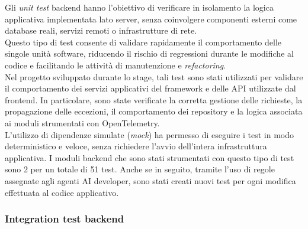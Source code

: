 Gli \emph{unit test} backend hanno l’obiettivo di verificare in isolamento la
logica applicativa implementata lato server, senza coinvolgere componenti esterni
come database reali, servizi remoti o infrastrutture di rete.\\
Questo tipo di test consente di validare rapidamente il comportamento delle
singole unità software, riducendo il rischio di regressioni durante le modifiche
al codice e facilitando le attività di manutenzione e \emph{refactoring}.\\
Nel progetto sviluppato durante lo stage, tali test sono stati utilizzati per
validare il comportamento dei servizi applicativi del framework e delle API
utilizzate dal frontend. In particolare, sono state verificate la corretta
gestione delle richieste, la propagazione delle eccezioni, il comportamento
dei repository e la logica associata ai moduli strumentati con OpenTelemetry.\\
L’utilizzo di dipendenze simulate (\emph{mock}) ha permesso di eseguire i test
in modo deterministico e veloce, senza richiedere l’avvio dell’intera
infrastruttura applicativa.
I moduli backend che sono stati strumentati con questo tipo di test sono 2
per un totale di 51 test. Anche se in seguito, tramite l'uso di regole assegnate agli
agenti AI developer, sono stati creati nuovi test per ogni modifica effettuata al codice
applicativo.

\subsubsection{Integration test backend}

